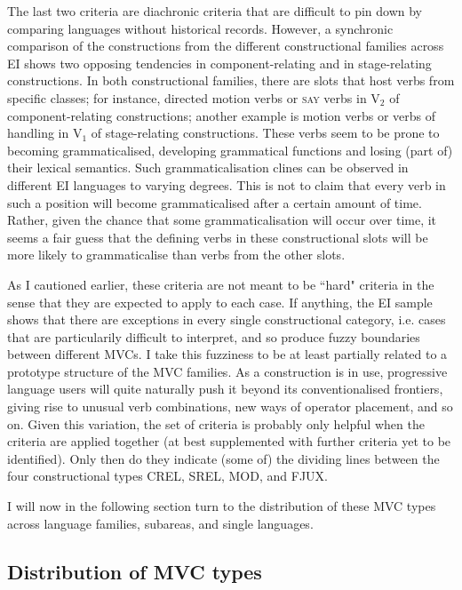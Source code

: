 \largerpage[-1]
The last two criteria are diachronic criteria that are difficult to pin down by comparing languages without historical records. However, a synchronic comparison of the constructions from the different constructional families across EI shows two opposing tendencies in component-relating and in stage-relating constructions. In both constructional families, there are slots that host verbs from specific classes; for instance, directed motion verbs or \textsc{say} verbs in V$_2$ of component-relating constructions; another example is motion verbs or verbs of handling in V$_1$ of stage-relating constructions. These verbs seem to be prone to becoming grammaticalised, developing grammatical functions and losing (part of) their lexical semantics. Such grammaticalisation clines can be observed in different EI languages to varying degrees. This is not to claim that every verb in such a position will become grammaticalised after a certain amount of time. Rather, given the chance that some grammaticalisation will occur over time, it seems a fair guess that the defining verbs in these constructional slots will be more likely to grammaticalise than verbs from the other slots.

As I cautioned earlier, these criteria are not meant to be ``hard" criteria in the sense that they are expected to apply to each case. If anything, the EI sample shows that there are exceptions in every single constructional category, i.e. cases that are particularily difficult to interpret, and so produce fuzzy boundaries between different MVCs. I take this fuzziness to be at least partially related to a prototype structure of the MVC families. As a construction is in use, progressive language users will quite naturally push it beyond its conventionalised frontiers, giving rise to unusual verb combinations, new ways of operator placement, and so on. Given this variation, the set of criteria is probably only helpful when the criteria are applied together (at best supplemented with further criteria yet to be identified). Only then do they indicate (some of) the dividing lines between the four constructional types CREL, SREL, MOD, and FJUX. 

I will now in the following section turn to the distribution of these MVC types across language families, subareas, and single languages.

\subsection{Distribution of MVC types}\label{sec:dist_types}

